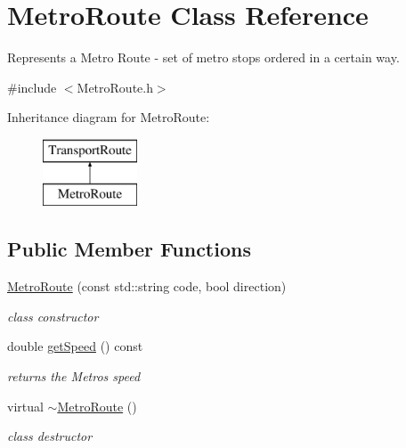 \hypertarget{class_metro_route}{}\section{Metro\+Route Class Reference}
\label{class_metro_route}


Represents a Metro Route -\/ set of metro stops ordered in a certain way.  




{\ttfamily \#include $<$Metro\+Route.\+h$>$}

Inheritance diagram for Metro\+Route\+:\begin{figure}[H]
\begin{center}
\leavevmode
\includegraphics[height=2.000000cm]{class_metro_route}
\end{center}
\end{figure}
\subsection*{Public Member Functions}
\begin{DoxyCompactItemize}
\item 
\hyperlink{class_metro_route_aeb6e7b46697d63fd8373ca92a6ba9290}{Metro\+Route} (const std\+::string code, bool direction)
\begin{DoxyCompactList}\small\item\em class constructor \end{DoxyCompactList}\item 
\hypertarget{class_metro_route_a2445c22d84f3c3a2a6ccf65140b6b88d}{}double \hyperlink{class_metro_route_a2445c22d84f3c3a2a6ccf65140b6b88d}{get\+Speed} () const \label{class_metro_route_a2445c22d84f3c3a2a6ccf65140b6b88d}

\begin{DoxyCompactList}\small\item\em returns the Metro\textquotesingle{}s speed \end{DoxyCompactList}\item 
\hypertarget{class_metro_route_ae9c460e869b09a5a46abae9e3491978c}{}virtual \hyperlink{class_metro_route_ae9c460e869b09a5a46abae9e3491978c}{$\sim$\+Metro\+Route} ()\label{class_metro_route_ae9c460e869b09a5a46abae9e3491978c}

\begin{DoxyCompactList}\small\item\em class destructor \end{DoxyCompactList}\end{DoxyCompactItemize}
